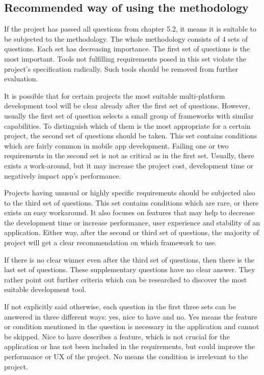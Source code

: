 \documentclass[english,master,public,dept460,male,cpdeclaration,oneside]{diploma}
\begin{document}
\subsection{Recommended way of using the methodology}
If the project has passed all questions from chapter 5.2, it means it is suitable to be subjected to the methodology. The whole methodology consists of 4 sets of questions. Each set has decreasing importance. The first set of questions is the most important. Tools not fulfilling requirements posed in this set violate the project's specification radically. Such tools should be removed from further evaluation.
	
It is possible that for certain projects the most suitable multi-platform development tool will be clear already after the first set of questions. However, usually the first set of question selects a small group of frameworks with similar capabilities. To distinguish which of them is the most appropriate for a certain project, the second set of questions should be taken. This set contains conditions which are fairly common in mobile app development. Failing one or two requirements in the second set is not as critical as in the first set. Usually, there exists a work-around, but it may increase the project cost, development time or negatively impact app's performance.
	
Projects having unusual or highly specific requirements should be subjected also to the third set of questions. This set contains conditions which are rare, or there exists an easy workaround. It also focuses on features that may help to decrease the development time or increase performance, user experience and stability of an application. Either way, after the second or third set of questions, the majority of project will get a clear recommendation on which framework to use.
	
If there is no clear winner even after the third set of questions, then there is the last set of questions. These supplementary questions have no clear answer. They rather point out further criteria which can be researched to discover the most suitable development tool.
	
If not explicitly said otherwise, each question in the first three sets can be answered in three different ways: yes, nice to have and no. Yes means the feature or condition mentioned in the question is necessary in the application and cannot be skipped. Nice to have describes a feature, which is not crucial for the application or has not been included in the requirements, but could improve the performance or UX of the project. No means the condition is irrelevant to the project.
	
\end{document}
